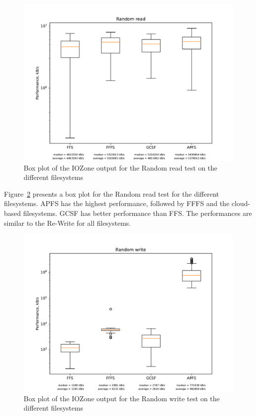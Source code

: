 \begin{figure}[!ht]
	\label{fig:res_box_rndread}
	\begin{center}
		\includegraphics[width=1.0\textwidth]{figures.nosync/benchmarking/Random read_box.pdf}
	\end{center}
	\caption{Box plot of the IOZone output for the Random read test on the different filesystems}
\end{figure}

\FloatBarrier

Figure~\ref{fig:res_box_rndwrite} presents a box plot for the Random read test for the different filesystems. \gls{APFS} has the highest performance, followed by \gls{FFFS} and the cloud-based filesystems. \gls{GCSF} has better performance than \gls{FFS}. The performances are similar to the \mbox{Re-Write} for all filesystems.

\begin{figure}[!ht]
	\label{fig:res_box_rndwrite}
	\begin{center}
		\includegraphics[width=1.0\textwidth]{figures.nosync/benchmarking/Random write_box.pdf}
	\end{center}
	\caption{Box plot of the IOZone output for the Random write test on the different filesystems}
\end{figure}

